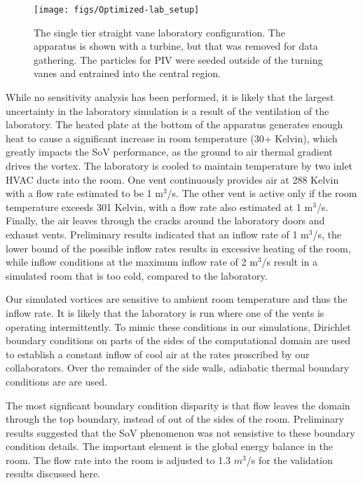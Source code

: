 %
%
 \begin{figure}[!htb]
   \begin{center}
    \texttt{[image: figs/Optimized-lab\_setup]}
    \caption{The single tier straight vane laboratory configuration. The
    apparatus is shown with a turbine, but that was removed for data
    gathering. The particles for PIV were seeded outside of the turning
    vanes and entrained into the central region.}
    \label{fig:lab_image}
   \end{center}
 \end{figure}

While no sensitivity analysis has been performed, it is likely that the
largest uncertainty in the laboratory simulation is a result of the
ventilation of the laboratory. The heated plate at the bottom of the apparatus
generates enough heat to cause a significant increase in room
temperature (30+ Kelvin), which greatly impacts the SoV
performance, as the ground to air thermal gradient drives the
vortex. The laboratory is cooled to maintain
temperature by two inlet HVAC ducts into the room. 
One vent continuously provides air at 288 Kelvin with a flow rate estimated 
to be 1 $\text{m}^3$/s.
The other vent is active only if the room temperature exceeds 301 Kelvin, 
with a flow rate also estimated at 1 $\text{m}^3$/s.
Finally, the air leaves through the cracks around the laboratory doors and 
exhaust vents. Preliminary results indicated that an inflow rate of 1
$\text{m}^3$/s, the lower bound of the possible inflow rates results in
excessive heating of the room, while inflow conditions at the maximum
inflow rate of 2 $\text{m}^3$/s result in a simulated room that is too cold,
compared to the laboratory.  

Our simulated vortices are sensitive to ambient room temperature and thus 
the inflow rate. It is likely that the laboratory is run where one of
the vents is operating intermittently. 
To mimic these conditions in our simulations, Dirichlet boundary conditions 
on parts of the sides of the computational domain are used to
establish a constant inflow of cool air at the rates 
proscribed by our collaborators. Over the remainder of the side walls, 
adiabatic thermal boundary conditions are are used. 

The most signficant boundary condition disparity is that flow leaves the
domain through the top boundary, instead of out of the sides of the
room. Preliminary results suggested that the SoV phenomenon  was not
sensistive to these boundary condition details. The important element is
the  global energy balance in the room. The flow rate into the room is
adjusted to  1.3 $m^3$/s for the validation results discussed here.  

